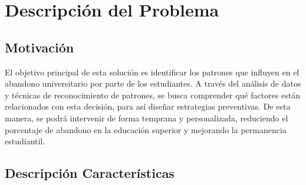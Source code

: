 \section*{Descripción del Problema}



\subsection*{Motivación}
El objetivo principal de esta solución es identificar los patrones que influyen en el abandono universitario por parte de los estudiantes. A través del análisis de datos y técnicas de reconocimiento de patrones, se busca comprender qué factores están relacionados con esta decisión, para así diseñar estrategias preventivas. De esta manera, se podrá intervenir de forma temprana y personalizada, reduciendo el porcentaje de abandono en la educación superior y mejorando la permanencia estudiantil.




\subsection*{Descripción Características}

